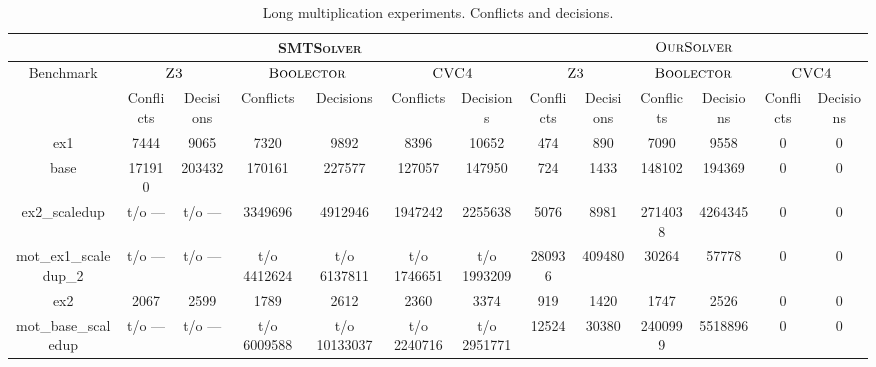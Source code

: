 \begin{sidewaystable}[t]
\centering
\caption{Long multiplication experiments. Conflicts and decisions.}
\label{my-label}
\begin{tabular}{|c|c|c|c|c|c|c|c|c|c|c|c|c|}
\hline
                      & \multicolumn{6}{c|}{\textsc{SMTSolver}}                                                            & \multicolumn{6}{c|}{$\textsc{OurSolver}$}                                                                      \\ \hline
Benchmark             & \multicolumn{2}{c|}{$\textsc{Z3}$} & \multicolumn{2}{c|}{$\textsc{Boolector}$} & \multicolumn{2}{c|}{$\textsc{CVC4}$} & \multicolumn{2}{c|}{$\textsc{Z3}$} & \multicolumn{2}{c|}{$\textsc{Boolector}$} & \multicolumn{2}{c|}{$\textsc{CVC4}$} \\ \hline
                      & Conflicts      & Decisions     & Conflicts       & Decisions       & Conflicts      & Decisions      & Conflicts      & Decisions     & Conflicts       & Decisions       & Conflicts      & Decisions      \\ \hline
ex1                   & 7444           & 9065          & 7320            & 9892            & 8396           & 10652          & 474            & 890           & 7090            & 9558            & 0              & 0              \\ \hline
base                  & 171910         & 203432        & 170161          & 227577          & 127057         & 147950         & 724            & 1433          & 148102          & 194369          & 0              & 0              \\ \hline
ex2\_scaledup         & t/o ---        & t/o ---       & 3349696         & 4912946         & 1947242        & 2255638        & 5076           & 8981          & 2714038         & 4264345         & 0              & 0              \\ \hline
mot\_ex1\_scaledup\_2 & t/o ---        & t/o ---       & t/o 4412624     & t/o 6137811     & t/o 1746651    & t/o 1993209    & 280936         & 409480        & 30264           & 57778           & 0              & 0              \\ \hline
ex2                   & 2067           & 2599          & 1789            & 2612            & 2360           & 3374           & 919            & 1420          & 1747            & 2526            & 0              & 0              \\ \hline
mot\_base\_scaledup   & t/o ---        & t/o ---       & t/o 6009588     & t/o 10133037    & t/o 2240716    & t/o 2951771    & 12524          & 30380         & 2400999         & 5518896         & 0              & 0              \\ \hline

\end{tabular}
\end{sidewaystable}
